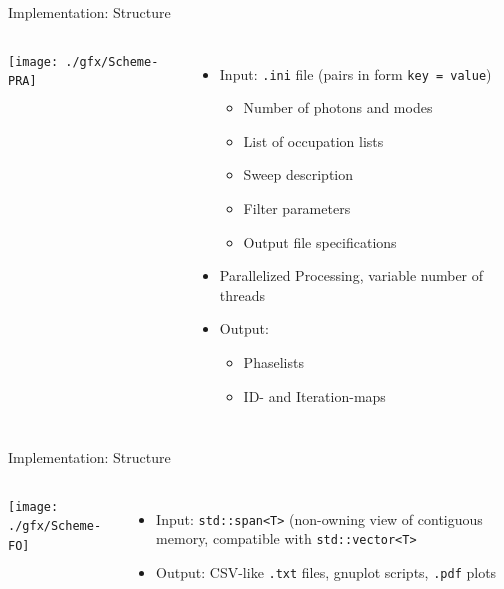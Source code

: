 \begin{frame}{Implementation: Structure}
%
\begin{columns}[t]
\vspace{-20pt}
\begin{center}
	\texttt{[image: ./gfx/Scheme-PRA]}
\end{center}
%
\begin{itemize}
\item Input: \texttt{.ini} file (pairs in form \texttt{key = value})
	\begin{itemize}
	\item Number of photons and modes
	\item List of occupation lists
	\item Sweep description
	\item Filter parameters
	\item Output file specifications
	\end{itemize}
\item Parallelized Processing, variable number of threads
\item Output:
	\begin{itemize}
	\item Phaselists
	\item ID- and Iteration-maps
	\end{itemize}
\end{itemize}
\end{columns}
%
\end{frame}


\begin{frame}{Implementation: Structure}
%
\begin{columns}[t]
\begin{center}
	\texttt{[image: ./gfx/Scheme-FO]}
\end{center}
%
\begin{itemize}
\item Input: \texttt{std::span<T>} (non-owning view of contiguous memory, compatible with \texttt{std::vector<T>}
\item Output: CSV-like \texttt{.txt} files, gnuplot scripts, \texttt{.pdf} plots
\end{itemize}
\end{columns}
%
\end{frame}


